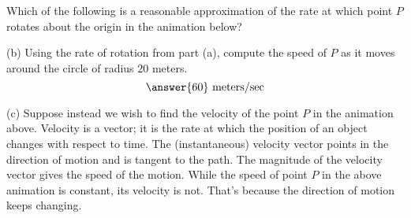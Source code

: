 \documentclass{ximera}
\begin{document}

\begin{question}   \label{Qdfg4bk:Cross}
Which of the following is a reasonable approximation of the rate at which point $P$ rotates about the origin in the animation below?
\begin{multipleChoice}  
\end{multipleChoice}  

(b) Using the rate of rotation from part (a), compute the speed of $P$ as it moves around the circle of radius $20$ meters. 
\[
   \answer{60} \text{ meters/sec}
\]

\end{question}


 
\begin{onlineOnly}
    \begin{center}
\end{center}
\end{onlineOnly}


(c) Suppose instead we wish to find the velocity of the point $P$ in the animation above. Velocity is a vector; it is the rate at which the position of an object changes with respect to time. The (instantaneous) velocity vector points in the direction of motion and is  tangent to the path. The magnitude of the velocity vector gives the speed of the motion. While the speed of point $P$ in the above animation is constant, its velocity is not. That's because the direction of motion keeps changing.
\end{document}
